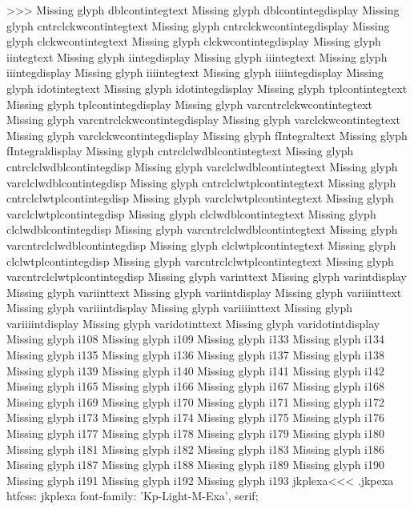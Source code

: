 >>>
Missing glyph	dblcontintegtext
Missing glyph	dblcontintegdisplay
Missing glyph	cntrclckwcontintegtext
Missing glyph	cntrclckwcontintegdisplay
Missing glyph	clckwcontintegtext
Missing glyph	clckwcontintegdisplay
Missing glyph	iintegtext
Missing glyph	iintegdisplay
Missing glyph	iiintegtext
Missing glyph	iiintegdisplay
Missing glyph	iiiintegtext
Missing glyph	iiiintegdisplay
Missing glyph	idotintegtext
Missing glyph	idotintegdisplay
Missing glyph	tplcontintegtext
Missing glyph	tplcontintegdisplay
Missing glyph	varcntrclckwcontintegtext
Missing glyph	varcntrclckwcontintegdisplay
Missing glyph	varclckwcontintegtext
Missing glyph	varclckwcontintegdisplay
Missing glyph	fIntegraltext
Missing glyph	fIntegraldisplay
Missing glyph	cntrclclwdblcontintegtext
Missing glyph	cntrclclwdblcontintegdisp
Missing glyph	varclclwdblcontintegtext
Missing glyph	varclclwdblcontintegdisp
Missing glyph	cntrclclwtplcontintegtext
Missing glyph	cntrclclwtplcontintegdisp
Missing glyph	varclclwtplcontintegtext
Missing glyph	varclclwtplcontintegdisp
Missing glyph	clclwdblcontintegtext
Missing glyph	clclwdblcontintegdisp
Missing glyph	varcntrclclwdblcontintegtext
Missing glyph	varcntrclclwdblcontintegdisp
Missing glyph	clclwtplcontintegtext
Missing glyph	clclwtplcontintegdisp
Missing glyph	varcntrclclwtplcontintegtext
Missing glyph	varcntrclclwtplcontintegdisp
Missing glyph	varinttext
Missing glyph	varintdisplay
Missing glyph	variinttext
Missing glyph	variintdisplay
Missing glyph	variiinttext
Missing glyph	variiintdisplay
Missing glyph	variiiinttext
Missing glyph	variiiintdisplay
Missing glyph	varidotinttext
Missing glyph	varidotintdisplay
Missing glyph	i108
Missing glyph	i109
Missing glyph	i133
Missing glyph	i134
Missing glyph	i135
Missing glyph	i136
Missing glyph	i137
Missing glyph	i138
Missing glyph	i139
Missing glyph	i140
Missing glyph	i141
Missing glyph	i142
Missing glyph	i165
Missing glyph	i166
Missing glyph	i167
Missing glyph	i168
Missing glyph	i169
Missing glyph	i170
Missing glyph	i171
Missing glyph	i172
Missing glyph	i173
Missing glyph	i174
Missing glyph	i175
Missing glyph	i176
Missing glyph	i177
Missing glyph	i178
Missing glyph	i179
Missing glyph	i180
Missing glyph	i181
Missing glyph	i182
Missing glyph	i183
Missing glyph	i186
Missing glyph	i187
Missing glyph	i188
Missing glyph	i189
Missing glyph	i190
Missing glyph	i191
Missing glyph	i192
Missing glyph	i193
\<jkplexa\><<<
.jkpexa
htfcss:  jkplexa  font-family: 'Kp-Light-M-Exa', serif;

